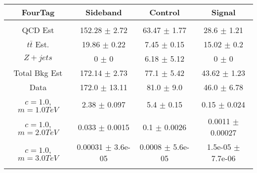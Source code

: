 \begin{footnotesize} 
\begin{tabular}{c|c|c|c} 
FourTag & Sideband & Control & Signal \\ 
\hline\hline 
& & & \\ 
QCD Est & 152.28 $\pm$ 2.72 & 63.47 $\pm$ 1.77 & 28.6 $\pm$ 1.21\\ 
$t\bar{t}$ Est.  & 19.86 $\pm$ 0.22 & 7.45 $\pm$ 0.15 & 15.02 $\pm$ 0.2\\ 
$Z+jets$ & 0 $\pm$ 0 & 6.18 $\pm$ 5.12 & 0 $\pm$ 0\\ 
Total Bkg Est & 172.14 $\pm$ 2.73 & 77.1 $\pm$ 5.42 & 43.62 $\pm$ 1.23\\ 
Data & 172.0 $\pm$ 13.11 & 81.0 $\pm$ 9.0 & 46.0 $\pm$ 6.78\\ 
$c=1.0$,$m=1.0TeV$ & 2.38 $\pm$ 0.097 & 5.4 $\pm$ 0.15 & 0.15 $\pm$ 0.024\\ 
$c=1.0$,$m=2.0TeV$ & 0.033 $\pm$ 0.0015 & 0.1 $\pm$ 0.0026 & 0.0011 $\pm$ 0.00027\\ 
$c=1.0$,$m=3.0TeV$ & 0.00031 $\pm$ 3.6e-05 & 0.0008 $\pm$ 5.6e-05 & 1.5e-05 $\pm$ 7.7e-06\\ 
& & & \\ 
\hline\hline 
\end{tabular} 
\end{footnotesize} 
\newline 
